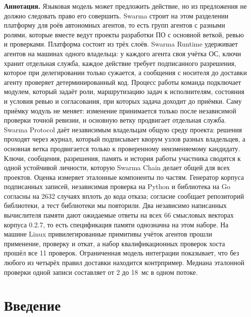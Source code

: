 \documentclass[10pt,a4paper]{article}
\begin{document}
\begin{list}{}{\leftmargin=0.9cm\rightmargin=0.9cm}
\item\small
\textbf{Аннотация.} Языковая модель может предложить действие, но из предложения не должно следовать право его совершить. Swarma строит на этом разделении платформу для роёв автономных агентов, то есть групп агентов с разными ролями, которые вместе ведут проекты разработки ПО с основной веткой, ревью и проверками. Платформа состоит из трёх слоёв. Swarma Runtime удерживает агентов на машинах одного владельца: у каждого агента своя учётка ОС, ключи хранит отдельная служба, каждое действие требует подписанного разрешения, которое при делегировании только сужается, а сообщения с носителя до доставки агенту проверяет детерминированный код. Процесс работы команда подключает модулем, который задаёт роли, маршрутизацию задач к исполнителям, состояния и условия ревью и согласования, при которых задача доходит до приёмки. Саму приёмку модуль не меняет: изменение принимается только после независимой проверки точной ревизии, и основную ветку продвигает отдельная служба. Swarma Protocol даёт независимым владельцам общую среду проекта: решения проходят через журнал, который подписывает кворум узлов разных владельцев, а основная ветка продвигается только к проверенному неизменяемому кандидату. Ключи, сообщения, разрешения, память и история работы участника сводятся к одной устойчивой личности, которую Swarma Chain делает общей для всех проектов. Оценка измеряет эталонные компоненты по частям. Генератор корпуса подписанных записей, независимая проверка на Python и библиотека на Go согласны на 2632 случаях вплоть до кода отказа; согласие сообщает репозиторий библиотеки, а тест библиотеки мы повторили. Два независимо написанных вычислителя памяти дают ожидаемые ответы на всех 66 смысловых векторах корпуса 0.2.7, то есть спецификация памяти однозначна на этом наборе. На машине Linux привилегированные примитивы учёток агентов прошли применение, проверку и откат, а набор квалификационных проверок хоста прошёл все 11 проверок. Ограниченная модель интеграции показывает, что без любого из четырёх правил доставки находится контрпример. Медиана эталонной проверки одной записи составляет от 2 до 18~мс в одном потоке.
\end{list}

\section{Введение}
\label{sec:intro}
\end{document}
